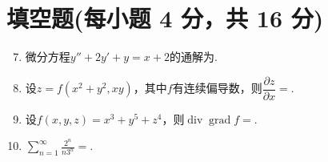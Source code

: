 \documentclass[../Main.tex]{subfiles}
\begin{document}
\section{填空题(每小题 4 分，共 16 分)}
\begin{enumerate}
    \setcounter{enumi}{6}
    \item 微分方程$y''+2y'+y=x+2$的通解为\underline{\hspace{5cm}}.

    \item 设$z=f(x^{2}+y^{2},xy)$，其中$f$有连续偏导数，则$\dfrac{\partial z}{\partial x}=$\underline{\hspace{4cm}}.

    \item 设$f(x,y,z)=x^{3}+y^{5}+z^{4}$，则$\operatorname{div}\operatorname{grad}f=$\underline{\hspace{4cm}}.

    \item $\displaystyle\sum_{n=1}^{\infty}\frac{2^{n}}{n3^{n}}=$\underline{\hspace{4cm}}.
\end{enumerate}
\end{document}
